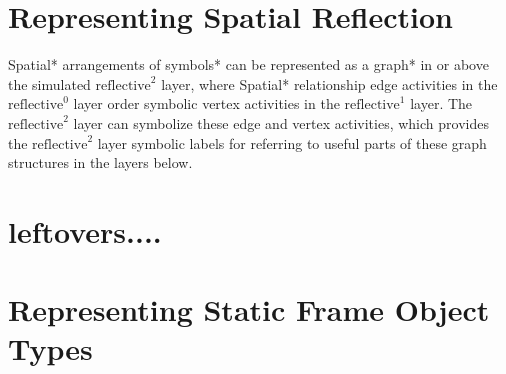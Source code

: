 \section{Representing Spatial Reflection}

Spatial* arrangements of symbols* can be represented as a graph* in or
above the simulated $\text{reflective}^2$ layer, where Spatial*
relationship edge activities in the $\text{reflective}^0$ layer order
symbolic vertex activities in the $\text{reflective}^1$ layer.  The
$\text{reflective}^2$ layer can symbolize these edge and vertex
activities, which provides the $\text{reflective}^2$ layer symbolic
labels for referring to useful parts of these graph structures in the
layers below.

 \noindent










\section{leftovers....}

\section{Representing Static Frame Object Types}

